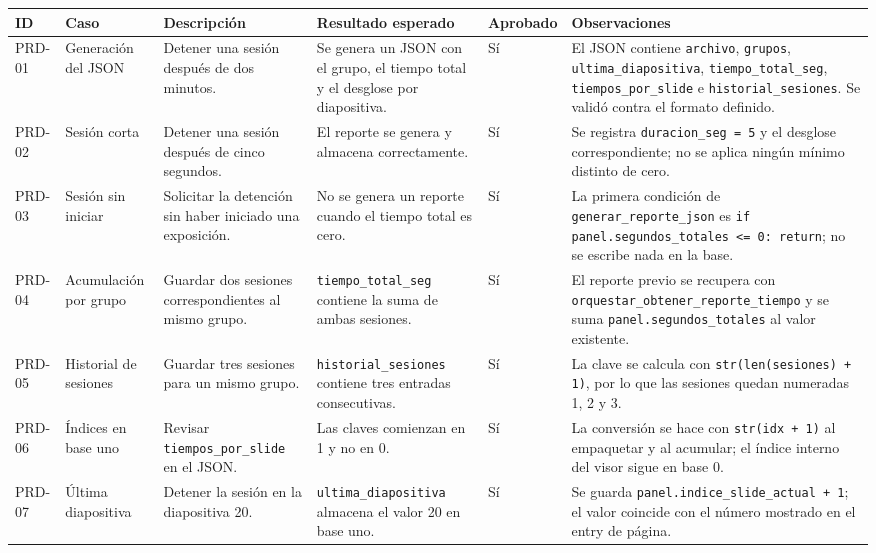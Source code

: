 \documentclass[12pt,letterpaper]{article}
\begin{document}
{\tiny
\renewcommand{\arraystretch}{1.15}
\begin{longtable}{|L{1.1cm}|L{2.3cm}|L{3.2cm}|L{3.6cm}|L{1.2cm}|L{3.6cm}|}
\hline
\textbf{ID} & \textbf{Caso} & \textbf{Descripción} & \textbf{Resultado esperado} & \textbf{Aprobado} & \textbf{Observaciones} \\ \hline
\endhead
PRD-01 & Generación del JSON & Detener una sesión después de dos minutos. & Se genera un JSON con el grupo, el tiempo total y el desglose por diapositiva. & Sí & El JSON contiene \texttt{archivo}, \texttt{grupos}, \texttt{ultima\_diapositiva}, \texttt{tiempo\_total\_seg}, \texttt{tiempos\_por\_slide} e \texttt{historial\_sesiones}. Se validó contra el formato definido. \\ \hline
PRD-02 & Sesión corta & Detener una sesión después de cinco segundos. & El reporte se genera y almacena correctamente. & Sí & Se registra \texttt{duracion\_seg = 5} y el desglose correspondiente; no se aplica ningún mínimo distinto de cero. \\ \hline
PRD-03 & Sesión sin iniciar & Solicitar la detención sin haber iniciado una exposición. & No se genera un reporte cuando el tiempo total es cero. & Sí & La primera condición de \texttt{generar\_reporte\_json} es \texttt{if panel.segundos\_totales <= 0: return}; no se escribe nada en la base. \\ \hline
PRD-04 & Acumulación por grupo & Guardar dos sesiones correspondientes al mismo grupo. & \texttt{tiempo\_total\_seg} contiene la suma de ambas sesiones. & Sí & El reporte previo se recupera con \texttt{orquestar\_obtener\_reporte\_tiempo} y se suma \texttt{panel.segundos\_totales} al valor existente. \\ \hline
PRD-05 & Historial de sesiones & Guardar tres sesiones para un mismo grupo. & \texttt{historial\_sesiones} contiene tres entradas consecutivas. & Sí & La clave se calcula con \texttt{str(len(sesiones) + 1)}, por lo que las sesiones quedan numeradas 1, 2 y 3. \\ \hline
PRD-06 & Índices en base uno & Revisar \texttt{tiempos\_por\_slide} en el JSON. & Las claves comienzan en 1 y no en 0. & Sí & La conversión se hace con \texttt{str(idx + 1)} al empaquetar y al acumular; el índice interno del visor sigue en base 0. \\ \hline
PRD-07 & Última diapositiva & Detener la sesión en la diapositiva 20. & \texttt{ultima\_diapositiva} almacena el valor 20 en base uno. & Sí & Se guarda \texttt{panel.indice\_slide\_actual + 1}; el valor coincide con el número mostrado en el entry de página. \\ \hline

\end{longtable}}
\end{document}
